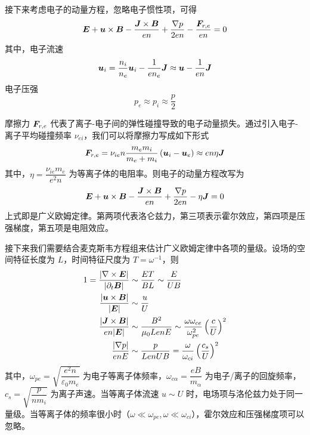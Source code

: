 接下来考虑电子的动量方程，忽略电子惯性项，可得
\begin{equation}
\vector{E} + \vector{u} \times \vector{B} - \frac{\vector{J} \times \vector{B}}{e n} + \frac{\grad{p}}{2 e n} - \frac{\vector{F}_{r,e}}{e n} = 0
\end{equation}
其中，电子流速
\begin{equation}
\vector{u}_i = \frac{n_i}{n_e}\vector{u}_i - \frac{1}{e n_e} \vector{J} \approx \vector{u} - \frac{1}{e n} \vector{J}
\end{equation}
电子压强
\begin{equation}
    p_e \approx p_i \approx \frac{p}{2}
\end{equation}

摩擦力 $\vector{F}_{r,e}$ 代表了离子-电子间的弹性碰撞导致的电子动量损失。通过引入电子-离子平均碰撞频率 $\nu_{ei}$，我们可以将摩擦力写成如下形式
\begin{equation}
\vector{F}_{r,e} = \nu_{ie} n \frac{m_e m_i}{m_e + m_i}
\left( \vector{u}_i - \vector{u}_e \right)
\approx e n \eta \vector{J}
\end{equation}
其中，$\eta = \dfrac{\nu_{ie} m_e}{e^2 n}$ 为等离子体的电阻率。则电子的动量方程改写为
\begin{equation}
\vector{E} + \vector{u} \times \vector{B} - \frac{\vector{J} \times \vector{B}}{e n} + \frac{\grad{p}}{2 e n} - \eta \vector{J} = 0
\end{equation}
上式即是广义欧姆定律。第两项代表洛仑兹力，第三项表示霍尔效应，第四项是压强梯度，第五项是电阻效应。

接下来我们需要结合麦克斯韦方程组来估计广义欧姆定律中各项的量级。设场的空间特征长度为 $L$，时间特征尺度为 $T = \omega^{-1}$，则
\begin{subequations}\begin{align}
1 = \frac{|\curl{\vector{E}}|}{|\pderiv{\vector{B}}{t}|} &\sim \frac{E T}{B L} \sim \frac{E}{U B} \\
\frac{|\vector{u} \times \vector{B}|}{|\vector{E}|} &\sim \frac{u}{U} \\
\frac{|\vector{J} \times \vector{B}|}{e n |\vector{E}|} &\sim \frac{B^2}{\mu_0 L e n E} \sim \frac{\omega \omega_{ce}}{\omega_{pe}^2} \left(\frac{c}{U}\right)^2 \\
\frac{|\grad{p}|}{e n E} &\sim \frac{p}{L e n U B} = \frac{\omega}{\omega_{ci}} \left(\frac{c_s}{U}\right)^2
\end{align}\end{subequations}
其中，$\omega_{pe} = \sqrt{\dfrac{e^2 n}{\varepsilon_0 m_e}}$ 为电子等离子体频率，$\omega_{c\alpha} = \dfrac{e B}{m_\alpha}$ 为电子/离子的回旋频率，$c_s = \sqrt{\dfrac{p}{n m_i}}$ 为离子声速。当等离子体流速 $u \sim U$ 时，电场项与洛伦兹力处于同一量级。当等离子体的频率很小时（$\omega \ll \omega_{pe}, \omega \ll \omega_{ci}$），霍尔效应和压强梯度项可以忽略。

